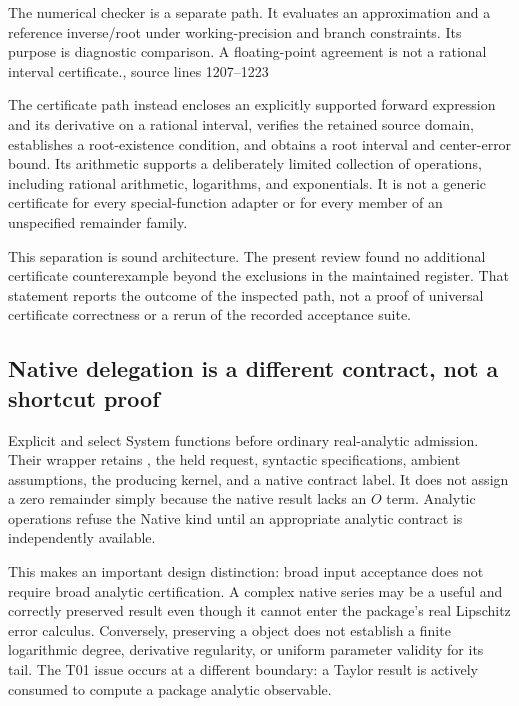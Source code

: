 \documentclass[11pt,letterpaper]{article}
\newcommand{\src}[2]{\cite{#1}, source lines #2}
\theoremstyle{definition}\newtheorem{definition}[proposition]{Definition}
\begin{document}
The numerical checker is a separate path. It evaluates an approximation and a
reference inverse/root under working-precision and branch constraints. Its
purpose is diagnostic comparison. A floating-point agreement is not a rational
interval certificate.\src{core}{1207--1223}

The certificate path instead encloses an explicitly supported forward
expression and its derivative on a rational interval, verifies the retained
source domain, establishes a root-existence condition, and obtains a root
interval and center-error bound. Its arithmetic supports a deliberately
limited collection of operations, including rational arithmetic, logarithms,
and exponentials. It is not a generic certificate for every special-function
adapter or for every member of an unspecified remainder family.
\cite{certificates}

This separation is sound architecture. The present review found no additional
certificate counterexample beyond the exclusions in the maintained register.
That statement reports the outcome of the inspected path, not a proof of
universal certificate correctness or a rerun of the recorded acceptance suite.

\subsection{Native delegation is a different contract, not a shortcut proof}
Explicit  and 
select System functions before ordinary real-analytic admission. Their wrapper
retains , the held request, syntactic specifications,
ambient assumptions, the producing kernel, and a native contract label.
It does not assign a zero remainder simply because the native result lacks an
$O$ term. Analytic operations refuse the Native kind until an appropriate
analytic contract is independently available.\cite{native,contracts}

This makes an important design distinction: broad input acceptance does not
require broad analytic certification. A complex native series may be a useful
and correctly preserved result even though it cannot enter the package's real
Lipschitz error calculus. Conversely, preserving a  object does
not establish a finite logarithmic degree, derivative regularity, or uniform
parameter validity for its tail. The T01 issue occurs at a different boundary:
a Taylor result is actively consumed to compute a package analytic observable.
\end{document}
